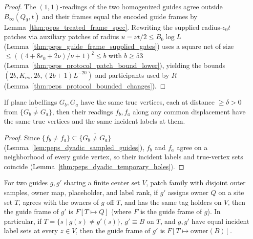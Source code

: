 \begin{proof}\leanok
    The $(1,1)$-readings of the two homogenized guides agree outside $\overline B_\infty(Q_0,t)$ and their frames equal the encoded guide frames by Lemma~\ref{thm:peps_treated_frame_spec}. Rewriting the supplied radius-$\epsilon_0t$ patches via auxiliary patches of radius $u=\nu t/2\le B_0\log L$ (Lemma~\ref{thm:peps_guide_frame_supplied_gates}) uses a square net of size $\le((4+8\epsilon_0+2\nu)/\nu+1)^2\le b$ with $b\ge53$ (Lemma~\ref{thm:peps_protocol_patch_bound_lower}), yielding the bounds $(2b,K_{\mathrm{rw}},2b,(2b+1)L^{-20})$ and participants used by $R$ (Lemma~\ref{thm:peps_protocol_bounded_changes}).
\end{proof}

\begin{lemma}
    \label{thm:peps_readings_far_change}
    \leanok
    If plane labellings $G_b,G_a$ have the same true vertices, each at distance $\ge\delta>0$ from $\overline{\{G_b\ne G_a\}}$, then their readings $f_b,f_a$ along any common displacement have the same true vertices and the same incident labels at them.
\end{lemma}

\begin{proof}\leanok
    Since $\{f_b\ne f_a\}\subseteq\overline{\{G_b\ne G_a\}}$ (Lemma~\ref{lem:peps_dyadic_sampled_guides}), $f_b$ and $f_a$ agree on a neighborhood of every guide vertex, so their incident labels and true-vertex sets coincide (Lemma~\ref{thm:peps_dyadic_temporary_holes}).
\end{proof}

\begin{lemma}
    \label{thm:peps_guide_frame_change_owner}
    \leanok
    For two guides $g,g'$ sharing a finite center set $V$, patch family with disjoint outer samples, owner map, placeholder, and label rank, if $g'$ assigns owner $Q$ on a site set $T$, agrees with the owners of $g$ off $T$, and has the same tag holders on $V$, then the guide frame of $g'$ is $F[T\mapsto Q]$ (where $F$ is the guide frame of $g$). In particular, if $T=\{s\mid g(s)\ne g'(s)\}$, $g'\equiv B$ on $T$, and $g,g'$ have equal incident label sets at every $z\in V$, then the guide frame of $g'$ is $F[T\mapsto\text{owner}(B)]$.
\end{lemma}

